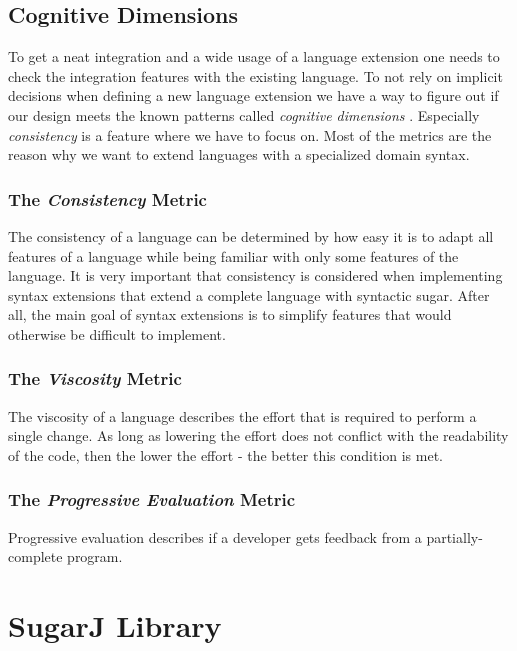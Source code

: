 \documentclass{report}
\begin{document}
\subsection{Cognitive Dimensions}

To get a neat integration and a wide usage of a language extension one needs to check the integration features with the existing language. To not rely on implicit decisions when defining a new language extension we have a way to figure out if our design meets the known patterns called \emph{cognitive dimensions} \cite{Green-Cognitive-1996}. Especially \emph{consistency} is a feature where we have to focus on. Most of the metrics are the reason why we want to extend languages with a specialized domain syntax.


\subsubsection*{The \emph{Consistency} Metric}

The consistency of a language can be determined by how easy it is to adapt all features of a language while being familiar with only some features of the language. It is very important that consistency is considered when implementing syntax extensions that extend a complete language with syntactic sugar. After all, the main goal of syntax extensions is to simplify features that would otherwise be difficult to implement.


\subsubsection*{The \emph{Viscosity} Metric}

The viscosity of a language describes the effort that is required to perform a single change. As long as lowering the effort does not conflict with the readability of the code, then the lower the effort - the better this condition is met.


\subsubsection*{The \emph{Progressive Evaluation} Metric}

Progressive evaluation describes if a developer gets feedback from a partially-complete program.


\section{SugarJ Library}
\end{document}
